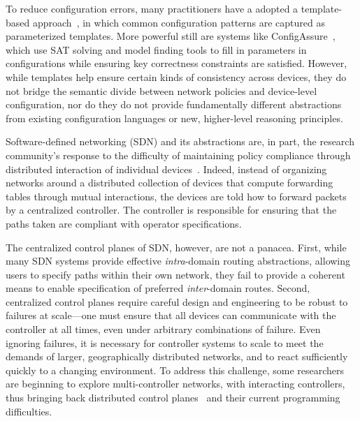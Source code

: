 To reduce configuration errors, many practitioners have a adopted a template-based
approach~\cite{hatch,thwack}, in which common configuration patterns are captured as parameterized templates.  More powerful still are systems like
ConfigAssure~\cite{narain:lisa05,narain+:configassure}, which use SAT solving
and model finding tools to fill in parameters in configurations while
ensuring key correctness constraints are satisfied.  However,
 while templates help ensure certain kinds of consistency across devices, 
they do not bridge the
semantic divide between network policies and device-level configuration,
nor do they do not provide fundamentally different abstractions
from existing configuration languages or new, higher-level reasoning 
principles.

Software-defined networking (SDN) and its abstractions 
are, in part, the research
community's response to the difficulty of maintaining policy
compliance through distributed interaction of individual
devices~\cite{sdn-languages}. Indeed, instead of organizing networks
around a distributed collection of devices that compute forwarding tables through
mutual interactions, the devices are told how to
forward packets by a centralized controller. The controller is responsible for ensuring that the
paths taken are compliant with operator specifications.

The centralized control planes of SDN, however, are not a panacea.
First, while many SDN systems provide effective \emph{intra}-domain routing
abstractions, allowing users to specify paths within their own network,
they fail to provide a coherent means to enable specification of preferred
\emph{inter}-domain routes.  Second, centralized control planes
require careful design and engineering to be robust to failures at scale---one must ensure that all devices can communicate with the controller at all times, even under arbitrary combinations of failure. Even ignoring failures, it is necessary for controller systems to
scale to meet the demands of larger, geographically distributed networks, 
and to react sufficiently quickly
to a changing environment. To address this challenge, some researchers are beginning to 
explore
multi-controller networks, with interacting controllers, thus bringing back distributed
control planes~\cite{mccauley2013extending,onos} and their current programming difficulties.  

